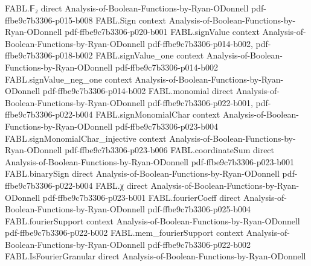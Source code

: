 \begin{theorem}
\leanok
{}
\proofstep
  {FABL.𝔽₂}
  {direct}
  {Analysis-of-Boolean-Functions-by-Ryan-ODonnell}
  {pdf-ffbe9c7b3306-p015-b008}
\proofstep
  {FABL.Sign}
  {context}
  {Analysis-of-Boolean-Functions-by-Ryan-ODonnell}
  {pdf-ffbe9c7b3306-p020-b001}
\proofstep
  {FABL.signValue}
  {context}
  {Analysis-of-Boolean-Functions-by-Ryan-ODonnell}
  {pdf-ffbe9c7b3306-p014-b002,
    pdf-ffbe9c7b3306-p018-b002}
\proofstep
  {FABL.signValue_one}
  {context}
  {Analysis-of-Boolean-Functions-by-Ryan-ODonnell}
  {pdf-ffbe9c7b3306-p014-b002}
\proofstep
  {FABL.signValue_neg_one}
  {context}
  {Analysis-of-Boolean-Functions-by-Ryan-ODonnell}
  {pdf-ffbe9c7b3306-p014-b002}
\proofstep
  {FABL.monomial}
  {direct}
  {Analysis-of-Boolean-Functions-by-Ryan-ODonnell}
  {pdf-ffbe9c7b3306-p022-b001,
    pdf-ffbe9c7b3306-p022-b004}
\proofstep
  {FABL.signMonomialChar}
  {context}
  {Analysis-of-Boolean-Functions-by-Ryan-ODonnell}
  {pdf-ffbe9c7b3306-p023-b004}
\proofstep
  {FABL.signMonomialChar_injective}
  {context}
  {Analysis-of-Boolean-Functions-by-Ryan-ODonnell}
  {pdf-ffbe9c7b3306-p023-b006}
\proofstep
  {FABL.coordinateSum}
  {direct}
  {Analysis-of-Boolean-Functions-by-Ryan-ODonnell}
  {pdf-ffbe9c7b3306-p023-b001}
\proofstep
  {FABL.binarySign}
  {direct}
  {Analysis-of-Boolean-Functions-by-Ryan-ODonnell}
  {pdf-ffbe9c7b3306-p022-b004}
\proofstep
  {FABL.χ}
  {direct}
  {Analysis-of-Boolean-Functions-by-Ryan-ODonnell}
  {pdf-ffbe9c7b3306-p023-b001}
\proofstep
  {FABL.fourierCoeff}
  {direct}
  {Analysis-of-Boolean-Functions-by-Ryan-ODonnell}
  {pdf-ffbe9c7b3306-p025-b004}
\proofstep
  {FABL.fourierSupport}
  {context}
  {Analysis-of-Boolean-Functions-by-Ryan-ODonnell}
  {pdf-ffbe9c7b3306-p022-b002}
\proofstep
  {FABL.mem_fourierSupport}
  {context}
  {Analysis-of-Boolean-Functions-by-Ryan-ODonnell}
  {pdf-ffbe9c7b3306-p022-b002}
\proofstep
  {FABL.IsFourierGranular}
  {direct}
  {Analysis-of-Boolean-Functions-by-Ryan-ODonnell}

\end{theorem}
